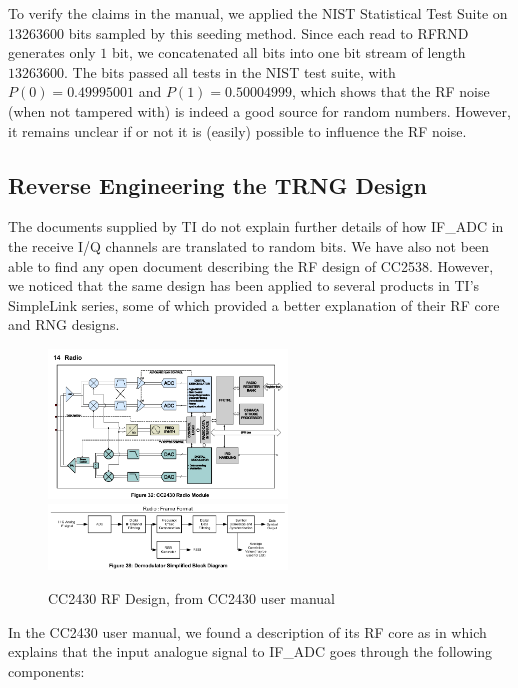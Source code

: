 To verify the claims in the manual, we applied the NIST Statistical Test Suite\cite{NISTTest} on 13263600 bits sampled by this seeding method. Since each read to RFRND generates only $1$ bit, we concatenated all bits into one bit stream of length $13263600$. The bits passed all tests in the NIST test suite, with $P(0) = 0.49995001$ and $P(1) = 0.50004999$, which shows that the RF noise (when not tampered with) is indeed a good source for random numbers. However, it remains unclear if or not it is (easily) possible to influence the RF noise. %


\subsection{Reverse Engineering the TRNG Design}
The documents supplied by TI do not explain further details of how IF\_ADC in the receive I/Q channels are translated to random bits. We have also not been able to find any open document describing the RF design of CC2538. However, we noticed that the same design has been applied to several products in TI's SimpleLink series, some of which provided a better explanation of their RF core and RNG designs. 

\begin{figure}[!t]
\centering
\includegraphics[width=2.5in]{fig/CC2430_Radio.png}
\includegraphics[width=2.5in]{fig/CC2430_Demodulator.png}
\caption{CC2430 RF Design, from CC2430 user manual\cite{CC2430Manual}}
\label{CC2430RF}
\end{figure}

In the CC2430 user manual\cite{CC2430Manual}, we found a description of its RF core as in  which explains that the input analogue signal to IF\_ADC goes through the following components:

